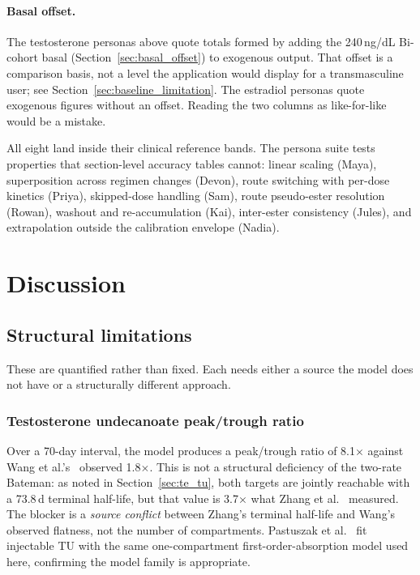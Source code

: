 \documentclass[11pt,a4paper]{article}
\begin{document}
\paragraph{Basal offset.} The testosterone personas above quote totals
formed by adding the 240\,ng/dL Bi-cohort basal
(Section~\ref{sec:basal_offset}) to exogenous output. That offset is a
comparison basis, not a level the application would display for a
transmasculine user; see Section~\ref{sec:baseline_limitation}. The
estradiol personas quote exogenous figures without an offset. Reading the
two columns as like-for-like would be a mistake.

All eight land inside their clinical reference bands. The persona suite
tests properties that section-level accuracy tables cannot: linear
scaling (Maya), superposition across regimen changes (Devon), route
switching with per-dose kinetics (Priya), skipped-dose handling (Sam),
route pseudo-ester resolution (Rowan), washout and re-accumulation
(Kai), inter-ester consistency (Jules), and extrapolation outside the
calibration envelope (Nadia).

\section{Discussion}
\label{sec:discussion}

\subsection{Structural limitations}
\label{sec:limitations}

These are quantified rather than fixed. Each needs either a source the
model does not have or a structurally different approach.

\subsubsection{Testosterone undecanoate peak/trough ratio}
\label{sec:tu_limitation}

Over a 70-day interval, the model produces a peak/trough ratio of
8.1$\times$ against Wang et al.'s~\cite{wang2010} observed 1.8$\times$.
This is not a structural deficiency of the two-rate Bateman: as noted in
Section~\ref{sec:te_tu}, both targets are jointly reachable with a
73.8\,d terminal half-life, but that value is 3.7$\times$ what Zhang et
al.~\cite{zhang1998} measured. The blocker is a \emph{source conflict}
between Zhang's terminal half-life and Wang's observed flatness, not the
number of compartments. Pastuszak et al.~\cite{pastuszak2021} fit
injectable TU with the same one-compartment first-order-absorption model
used here, confirming the model family is appropriate.
\end{document}
